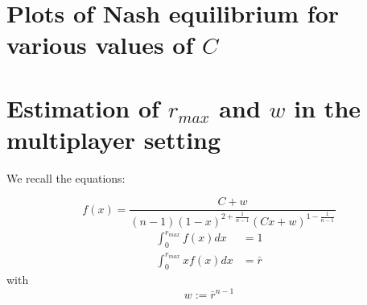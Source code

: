 \documentclass[preprint,12pt,authoryear,doubleblind]{elsarticle}
\theoremstyle{definition}
\begin{document}
\section{\texorpdfstring{Plots of Nash equilibrium for various values of $C$}{Plots of Nash equilibrium for various values of C}}
\label{more-nash}

\begin{figure}[H]
  \centering
  \begin{minipage}[t]{0.48\textwidth}
    \centering
    
  \end{minipage}
  \hfill
  \begin{minipage}[t]{0.48\textwidth}
    \centering
    
  \end{minipage}
  \centering
  \begin{minipage}[t]{0.48\textwidth}
    \centering
    
  \end{minipage}
  \hfill
  \begin{minipage}[t]{0.48\textwidth}
    \centering
    
  \end{minipage}
  \centering
  \begin{minipage}[t]{0.48\textwidth}
    \centering
    
  \end{minipage}
  \hfill
\end{figure}


\section{\texorpdfstring{Estimation of ${r_{max}}$ and $w$ in the multiplayer setting}{Estimation of rmax and w in the multiplayer setting}}
\label{estimate}

We recall the equations:

$$f(x) = \frac{C + w}{(n-1)(1-x)^{2+\frac{1}{n-1}} (C x + w)^{1 - \frac{1}{n-1}}}$$
\begin{align*}
        \int_0^{r_{max}} f(x) dx &= 1 \\
        \int_0^{r_{max}} x f(x) dx &= \bar r 
\end{align*}
with $$w := \bar r ^ {n-1}$$
\end{document}
